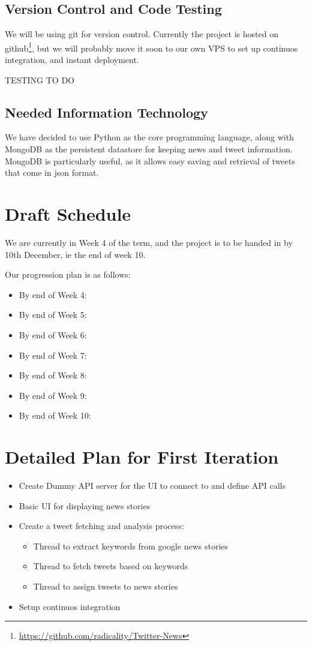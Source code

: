 \documentclass[a4paper,11pt]{article}
\begin{document}
	
		\subsection{Version Control and Code Testing}
		
			We will be using git for version control. Currently the project is hosted on github\footnote{\url{https://github.com/radicality/Twitter-News}}, but we will probably move it soon to our own VPS to set up continuos integration, and instant deployment.
			
			TESTING TO DO
			
			
		\subsection{Needed Information Technology}
			We have decided to use Python as the core programming language, along with MongoDB as the persistent datastore for keeping news and tweet information. MongoDB is particularly useful, as it allows easy saving and retrieval of tweets that come in json format.
			
	
	\section{Draft Schedule}
	
		We are currently in Week 4 of the term, and the project is to be handed in by 10th December, ie the end of week 10.
		
		Our progression plan is as follows:
		
		\begin{itemize}
			\item By end of Week 4: 
			\item By end of Week 5: 
			\item By end of Week 6: 
			\item By end of Week 7: 
			\item By end of Week 8: 
			\item By end of Week 9: 
			\item By end of Week 10:
		\end{itemize}
	
	\section{Detailed Plan for First Iteration}
	\begin{itemize}
	  \item Create Dummy API server for the UI to connect to and define API calls
	  \item Basic UI for displaying news stories
	  \item Create a tweet fetching and analysis process:
	  \begin{itemize}
	    \item Thread to extract keywords from google news stories
	    \item Thread to fetch tweets based on keywords
	    \item Thread to assign tweets to news stories
	  \end{itemize}
	  \item Setup continuos integration
	\end{itemize}
		
\end{document}
